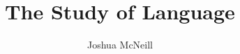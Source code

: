 

\usepackage{fontspec}
  \setmainfont{Charis SIL}
\usepackage{hyperref}
  \hypersetup{colorlinks=true,
              allcolors=blue}
\usepackage{graphicx}
  \graphicspath{{../figures/}}

\author{Joshua McNeill}
\title[LING2100]{The Study of Language}
\date{}

\newcommand{\lexi}[1]{\textit{#1}}
\newcommand{\orth}[1]{$\langle$#1$\rangle$}
\newcommand{\uttr}[1]{`#1'}
\newcommand{\sent}[1]{\textit{#1}}
\newcommand{\defs}{../definitions}

